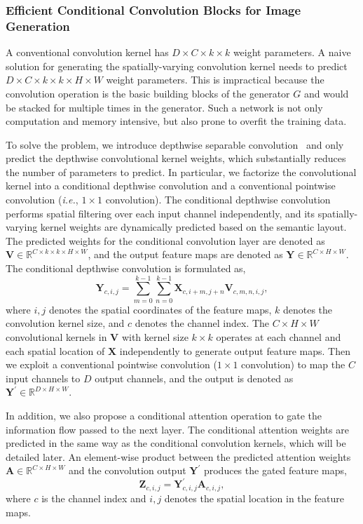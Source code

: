 \documentclass{article}
\newcommand{\ie}{\textit{i.e.}}
\begin{document}
\subsubsection{Efficient Conditional Convolution Blocks for Image Generation}
A conventional convolution kernel has $D \times C\times k\times k$ weight parameters. A naive solution for generating the spatially-varying convolution kernel needs to predict $D \times C\times k\times k\times H\times W$ weight parameters.
This is impractical because the convolution operation is the basic building blocks of the generator $G$ and would be stacked for multiple times in the generator. 
Such a network is not only computation and memory intensive, but also prone to overfit the training data.

To solve the problem, we introduce depthwise separable convolution~\cite{chollet2017xception} and only predict the depthwise convolutional kernel weights, which substantially reduces the number of parameters to predict.
In particular, we factorize the convolutional kernel into a conditional depthwise convolution and a conventional pointwise convolution (\ie, $1\times1$ convolution).
The conditional depthwise convolution performs spatial filtering over each input channel independently, and its spatially-varying kernel weights are dynamically predicted based on the semantic layout.
The predicted weights for the conditional convolution layer are denoted as $\mathbf{V}\in \mathbb{R}^{C\times k\times k\times H\times W}$, and the output feature maps are denoted as $\mathbf{Y}\in \mathbb{R}^{C\times H\times W}$.
The conditional depthwise convolution is formulated as,
\begin{equation}
  \mathbf{Y}_{c,i,j} = \sum_{m=0}^{k-1}\sum_{n=0}^{k-1}\mathbf{X}_{c,i+m,j+n}\mathbf{V}_{c,m,n,i,j},
\end{equation}
where $i,j$ denotes the spatial coordinates of the feature maps, $k$ denotes the convolution kernel size, and $c$ denotes the channel index. 
The $C\times H\times W$ convolutional kernels in $\mathbf{V}$ with kernel size $k\times k$ operates at each channel and each spatial location of $\mathbf{X}$ independently to generate output feature maps.
Then we exploit a conventional pointwise convolution ($1\times1$ convolution) to map the $C$ input channels to $D$ output channels, and the output is denoted as $\mathbf{Y}^\prime \in \mathbb{R}^{D\times H\times W}$.

In addition, we also propose a conditional attention operation to gate the information flow passed to the next layer.
The conditional attention weights are predicted in the same way as the conditional convolution kernels, which will be detailed later.
An element-wise product between the predicted attention weights $\mathbf{A}\in \mathbb{R}^{C\times H\times W}$ and the convolution output $\mathbf{Y}^\prime$ produces the gated feature maps,
\begin{equation}
  \mathbf{Z}_{c,i,j} = \mathbf{Y}^\prime_{c,i,j}\mathbf{A}_{c,i,j},
\end{equation}
where $c$ is the channel index and $i,j$ denotes the spatial location in the feature maps.
\end{document}
